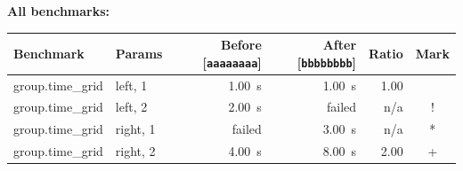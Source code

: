 
\noindent
\textbf{All benchmarks:}

\begin{tabular}{llrrrc}
\toprule
Benchmark & Params & Before [\texttt{aaaaaaaa}] & After [\texttt{bbbbbbbb}] & Ratio & Mark \\
\midrule
group.time\_grid & left, 1 & \qty{1.00}{\second} & \qty{1.00}{\second} & \num{1.00} &  \\
group.time\_grid & left, 2 & \qty{2.00}{\second} & failed & n/a & ! \\
group.time\_grid & right, 1 & failed & \qty{3.00}{\second} & n/a & * \\
group.time\_grid & right, 2 & \qty{4.00}{\second} & \qty{8.00}{\second} & \num{2.00} & + \\
\bottomrule
\end{tabular}
